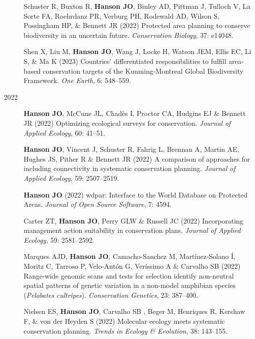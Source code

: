 \documentclass[12pt,a4paper]{article}
\begin{document}
\begin{description}
\item[] Schuster R, Buxton R, \textbf{Hanson JO}, Binley AD, Pittman J, Tulloch V, La Sorte FA, Roehrdanz PR, Verburg PH, Rodewald AD, Wilson S, Possingham HP, \& Bennett JR (2022) Protected area planning to conserve biodiversity in an uncertain future. \textit{Conservation Biology}, 37: e14048.

\item[] Shen X, Liu M, \textbf{Hanson JO}, Wang J, Locke H, Watson JEM, Ellis EC, Li S, \& Ma K (2023) Countries' differentiated responsibilities to fulfill area-based conservation targets of the Kunming-Montreal Global Biodiversity Framework. \textit{One Earth}, 6: 548--559.

\item[2022] \textbf{Hanson JO}, McCune JL, Chadès I, Proctor CA, Hudgins EJ \& Bennett JR (2022) Optimizing ecological surveys for conservation. \textit{Journal of Applied Ecology}, 60: 41--51.

\item[] \textbf{Hanson JO}, Vincent J, Schuster R, Fahrig L, Brennan A, Martin AE, Hughes JS, Pither R \& Bennett JR (2022) A comparison of approaches for including connectivity in systematic conservation planning. \textit{Journal of Applied Ecology}, 59: 2507--2519.

\item [] \textbf{Hanson JO} (2022) wdpar: Interface to the World Database on Protected Areas. \textit{Journal of Open Source Software}, 7: 4594.

\item [] Carter ZT, \textbf{Hanson JO}, Perry GLW \& Russell JC (2022) Incorporating management action suitability in conservation plans. \textit{Journal of Applied Ecology}, 59: 2581--2592.

\item[] Marques AJD, \textbf{Hanson JO}, Camacho-Sanchez M, Martínez‐Solano Í, Moritz C, Tarroso P, Velo‐Antón G, Veríssimo A \& Carvalho SB (2022) Range-wide genomic scans and tests for selection identify non-neutral spatial patterns of genetic variation in a non-model amphibian species (\textit{Pelobates cultripes}). \textit{Conservation Genetics}, 23: 387--400.

\item[] Nielsen ES, \textbf{Hanson JO}, Carvalho SB , Beger M, Henriques R, Kershaw F, \& von der Heyden S (2022) Molecular ecology meets systematic conservation planning. \textit{Trends in Ecology \& Evolution}, 38: 143--155.


\end{description}
\end{document}
